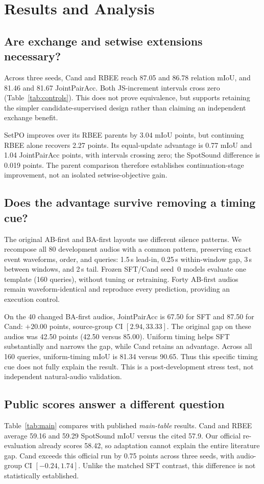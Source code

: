 \section{Results and Analysis}


\subsection{Are exchange and setwise extensions necessary?}
Across three seeds, Cand and RBEE reach 87.05 and 86.78 relation mIoU, and 81.46 and 81.67 JointPairAcc. Both JS-increment intervals cross zero (Table~\ref{tab:controls}). This does not prove equivalence, but supports retaining the simpler candidate-supervised design rather than claiming an independent exchange benefit.

SetPO improves over its RBEE parents by 3.04 mIoU points, but continuing RBEE alone recovers 2.27 points. Its equal-update advantage is 0.77 mIoU and 1.04 JointPairAcc points, with intervals crossing zero; the SpotSound difference is 0.019 points. The parent comparison therefore establishes continuation-stage improvement, not an isolated setwise-objective gain.

\subsection{Does the advantage survive removing a timing cue?}
\label{sec:timing}
The original AB-first and BA-first layouts use different silence patterns. We recompose all 80 development audios with a common pattern, preserving exact event waveforms, order, and queries: 1.5\,s lead-in, 0.25\,s within-window gap, 3\,s between windows, and 2\,s tail. Frozen SFT/Cand seed~0 models evaluate one template (160 queries), without tuning or retraining. Forty AB-first audios remain waveform-identical and reproduce every prediction, providing an execution control.

On the 40 changed BA-first audios, JointPairAcc is 67.50 for SFT and 87.50 for Cand: $+20.00$ points, source-group CI $[2.94,33.33]$. The original gap on these audios was 42.50 points (42.50 versus 85.00). Uniform timing helps SFT substantially and narrows the gap, while Cand retains an advantage. Across all 160 queries, uniform-timing mIoU is 81.34 versus 90.65. Thus this specific timing cue does not fully explain the result. This is a post-development stress test, not independent natural-audio validation.

\subsection{Public scores answer a different question}
Table~\ref{tab:main} compares with published \emph{main-table} results. Cand and RBEE average 59.16 and 59.29 SpotSound mIoU versus the cited 57.9. Our official re-evaluation already scores 58.42, so adaptation cannot explain the entire literature gap. Cand exceeds this official run by 0.75 points across three seeds, with audio-group CI $[-0.24,1.74]$. Unlike the matched SFT contrast, this difference is not statistically established.

